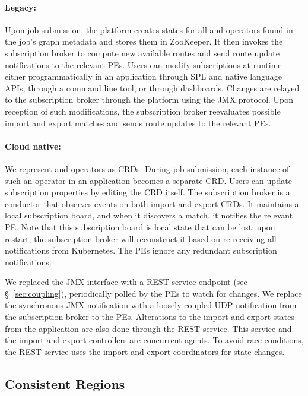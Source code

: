\paragraph{Legacy:} Upon job submission, the platform creates states for all
 and  operators found in the job's graph metadata and
stores them in ZooKeeper. It then invokes the subscription broker to compute new
available routes and send route update notifications to the relevant PEs.  Users
can modify subscriptions at runtime either programmatically in an application
through SPL and native language APIs, through a command line tool, or through
dashboards.  Changes are relayed to the subscription broker through the platform
using the JMX protocol. Upon reception of such modifications, the subscription
broker reevaluates possible import and export matches and sends
route updates to the relevant PEs.

\paragraph{Cloud native:} We represent  and  operators
as CRDs.  During job submission, each instance of such an operator in an
application becomes a separate CRD. Users can update subscription properties by
editing the CRD itself. The subscription broker is a conductor that
observes events on both import and export CRDs. It maintains a local
subscription board, and when it discovers a match, it notifies the relevant PE.
Note that this subscription board is local state that can be lost: upon restart,
the subscription broker will reconstruct it based on re-receiving all
notifications from Kubernetes.  The PEs ignore any redundant subscription
notifications.

We replaced the JMX interface with a REST service endpoint (see
\S~\ref{sec:coupling}), periodically polled by the PEs to watch for
changes. We replace the synchronous JMX notification with a loosely coupled UDP
notification from the subscription broker to the PEs.  Alterations to the
import and export states from the application are also done
through the REST service. This service and the import and export
controllers are concurrent agents. To avoid race conditions, the REST service
uses the import and export coordinators for state changes.

\subsection{Consistent Regions}
\label{sec:consistentregion}


